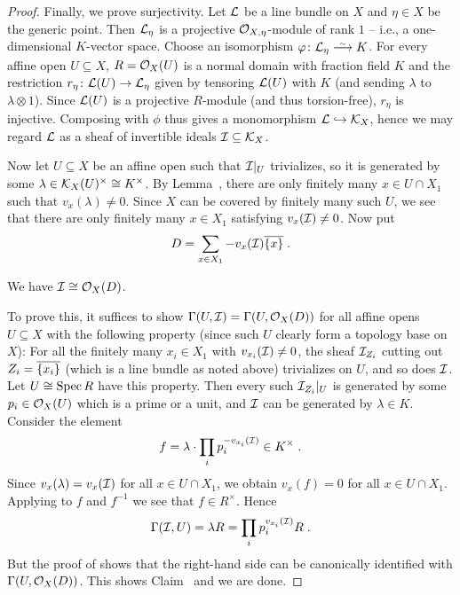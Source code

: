 \documentclass[a4paper,parskip=half,numbers=enddot, DIV=12]{scrreprt}
\begin{document}
\begin{proof}
	Finally, we prove surjectivity. Let $\mathcal{L}$ be a line bundle on $X$ and $\eta\in X$ be the generic point. Then $\mathcal{L}_\eta$ is a projective $\mathcal{O}_{X,\eta}$-module of rank $1$ -- i.e., a one-dimensional $K$-vector space. Choose an isomorphism $\phi\colon \Ll_\eta\isomorphism K$. For every affine open $U\subseteq X$, $R=\mathcal{O}_X(U)$ is a normal domain with fraction field $K$ and the restriction $r_\eta\colon \Ll(U)\morphism\Ll_\eta$ given by tensoring $\mathcal{L}(U)$ with $K$ (and sending $\lambda$ to $\lambda\otimes 1$). Since $\mathcal{L}(U)$ is a projective $R$-module (and thus torsion-free), $r_\eta$ is injective. Composing with $\phi$ thus gives a monomorphism $\Ll\monomorphism \Kk_X$, hence we may regard $\mathcal{L}$ as a sheaf of invertible ideals $\mathcal{I}\subseteq \mathcal{K}_X$.
	
	Now let $U\subseteq X$ be an affine open such that $\mathcal{I}|_U$ trivializes, so it is generated by some $\lambda\in \mathcal{K}_X(U)^\times\cong K^\times$. By Lemma~, there are only finitely many $x\in U\cap X_1$ such that $v_x(\lambda)\neq 0$. Since $X$ can be covered by finitely many such $U$, we see that there are only finitely many $x\in X_1$ satisfying $v_x(\mathcal{I})\neq 0$. Now put
	\begin{align*}
		D=\sum_{x\in X_1}-v_x(\mathcal{I})\overline{\{x\}}\;.
	\end{align*}
	\begin{claim}
		We have $\mathcal{I}\cong \mathcal{O}_X(D)$.
	\end{claim}
	To prove this, it suffices to show $\Gamma(U,\mathcal{I})=\Gamma(U,\mathcal{O}_X(D))$ for all affine opens $U\subseteq X$ with the following property (since such $U$ clearly form a topology base on $X$): For all the finitely many $x_i\in X_1$ with $v_{x_i}(\mathcal{I})\neq 0$, the sheaf $\mathcal{I}_{Z_i}$ cutting out $Z_i=\overline{\{x_i\}}$ (which is a line bundle as noted above) trivializes on $U$, and so does $\mathcal{I}$. Let $U\cong \operatorname{Spec} R$ have this property. Then every such $\mathcal{I}_{Z_i}|_U$ is generated by some $p_i\in \mathcal{O}_X(U)$ which is a prime or a unit, and $\mathcal{I}$ can be generated by $\lambda\in K$. Consider the element
	\begin{align*}
		f=\lambda\cdot\prod_ip_i^{-v_{x_i}(\mathcal{I})}\in K^\times\;.
	\end{align*}
	Since $v_x(\lambda)=v_x(\mathcal{I})$ for all $x\in U\cap X_1$, we obtain $v_x(f)=0$ for all $x\in U\cap X_1$. Applying  to $f$ and $f^{-1}$ we see that $f\in R^\times$. Hence
	\begin{align*}
		\Gamma(\mathcal{I},U)=\lambda R=\prod_ip_i^{v_{x_i}(\mathcal{I})}R\;.
	\end{align*}
	But the proof of  shows that the right-hand side can be canonically identified with $\Gamma(U,\mathcal{O}_X(D))$. This shows Claim~ and we are done.
\end{proof}
\end{document}
